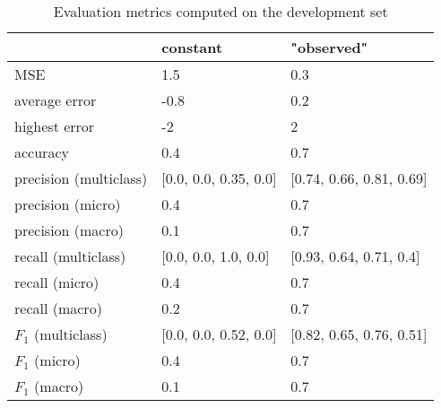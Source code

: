 \begin{table}[h]
\caption{Evaluation metrics computed on the development set}
\label{tbl:sais_eval_development}
\begin{tabular}{lll}
\toprule
 & constant & "observed" \\
\midrule
MSE & 1.5 & 0.3 \\
average error & -0.8 & 0.2 \\
highest error & -2 & 2 \\
accuracy & 0.4 & 0.7 \\
precision (multiclass) & [0.0, 0.0, 0.35, 0.0] & [0.74, 0.66, 0.81, 0.69] \\
precision (micro) & 0.4 & 0.7 \\
precision (macro) & 0.1 & 0.7 \\
recall (multiclass) & [0.0, 0.0, 1.0, 0.0] & [0.93, 0.64, 0.71, 0.4] \\
recall (micro) & 0.4 & 0.7 \\
recall (macro) & 0.2 & 0.7 \\
$F_1$ (multiclass) & [0.0, 0.0, 0.52, 0.0] & [0.82, 0.65, 0.76, 0.51] \\
$F_1$ (micro) & 0.4 & 0.7 \\
$F_1$ (macro) & 0.1 & 0.7 \\
\bottomrule
\end{tabular}
\end{table}
